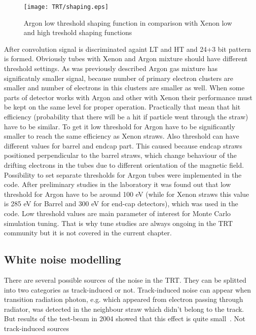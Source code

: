 \begin{figure}
\begin{center}
 \texttt{[image: TRT/shaping.eps]}
\caption{Argon low threshold shaping function in comparison with Xenon low and high treshold shaping functions}
\label{fig:shaping}
\end{center}
\end{figure}


After convolution signal is discriminated againt LT and HT and 24+3 bit pattern is formed.
Obviously tubes with Xenon and Argon mixture should have different threshold settings.
As was previously described Argon gas mixture has significatnly smaller signal, because
number of primary electron clusters are smaller and number of electrons in this clusters are smaller as well.
When some parts of detector works with Argon and other with Xenon their performance must be kept on the same level for
proper operation. Practically that mean that hit efficiency (probability that there will be a hit if particle went through the straw) have to be 
similar. To get it low threshold for Argon have to be significantly smaller to reach the same efficiency as Xenon straws.
Also threshold can have different values for barrel and endcap part. This caused because endcap straws positioned perpendicular to the barrel straws, 
which change behaviour of the drifting electrons in the tubes due to different orientation of the magnetic field.
Possibility to set separate thresholds for Argon tubes were implemented in the code.
After preliminary studies in the laboratory it was found out that low threshold for Argon have to be around 100 eV 
(while for Xenon straws this value is 285 eV for Barrel and 300 eV for end-cap detectors), which was used in the code.
Low threshold values are main parameter of interest for Monte Carlo simulation tuning. That is why tune studies are always ongoing 
in the TRT community but it is not covered in the current chapter.

\subsection{White noise modelling}

There are several possible sources of the noise in the TRT. They can be splitted into two categories as track-induced or not.
Track-induced noise can appear when transition radiation photon, e.g. which appeared from electron passing through radiator, was detected in the neighbour straw which didn't belong to the track.
But results of the test-beam in 2004 showed that this effect is quite small~\cite{trt_test_beam}.
Not track-induced sources 


